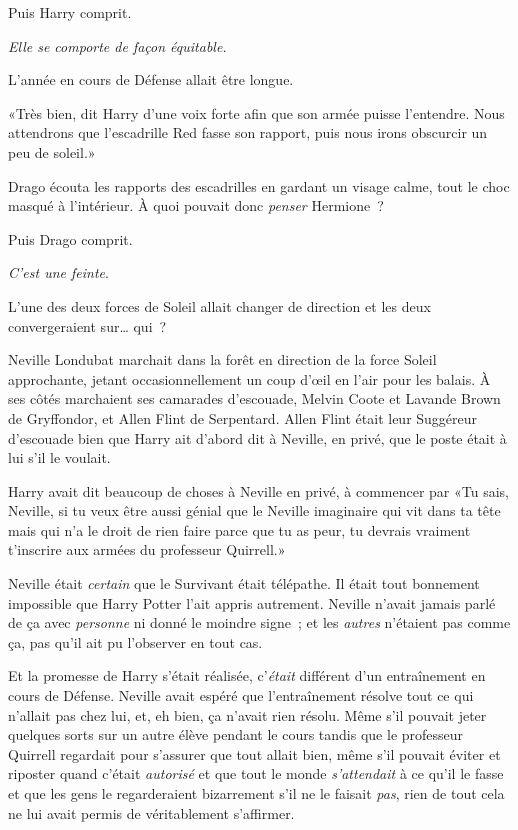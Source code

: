 Puis Harry comprit.

\emph{Elle se comporte de façon équitable.}

L'année en cours de Défense allait être longue.

«Très bien, dit Harry d'une voix forte afin que son armée puisse l'entendre. Nous attendrons que l'escadrille Red fasse son rapport, puis nous irons obscurcir un peu de soleil.»

\later

Drago écouta les rapports des escadrilles en gardant un visage calme, tout le choc masqué à l'intérieur. À quoi pouvait donc \emph{penser} Hermione~?

Puis Drago comprit.

\emph{C'est une feinte}.

L'une des deux forces de Soleil allait changer de direction et les deux convergeraient sur… qui~?

\later

Neville Londubat marchait dans la forêt en direction de la force Soleil approchante, jetant occasionnellement un coup d'œil en l'air pour les balais. À ses côtés marchaient ses camarades d'escouade, Melvin Coote et Lavande Brown de Gryffondor, et Allen Flint de Serpentard. Allen Flint était leur Suggéreur d'escouade bien que Harry ait d'abord dit à Neville, en privé, que le poste était à lui s'il le voulait.

Harry avait dit beaucoup de choses à Neville en privé, à commencer par «Tu sais, Neville, si tu veux être aussi génial que le Neville imaginaire qui vit dans ta tête mais qui n'a le droit de rien faire parce que tu as peur, tu devrais vraiment t'inscrire aux armées du professeur Quirrell.»

Neville était \emph{certain} que le Survivant était télépathe. Il était tout bonnement impossible que Harry Potter l'ait appris autrement. Neville n'avait jamais parlé de ça avec \emph{personne} ni donné le moindre signe~; et les \emph{autres} n'étaient pas comme ça, pas qu'il ait pu l'observer en tout cas.

Et la promesse de Harry s'était réalisée, c'\emph{était} différent d'un entraînement en cours de Défense. Neville avait espéré que l'entraînement résolve tout ce qui n'allait pas chez lui, et, eh bien, ça n'avait rien résolu. Même s'il pouvait jeter quelques sorts sur un autre élève pendant le cours tandis que le professeur Quirrell regardait pour s'assurer que tout allait bien, même s'il pouvait éviter et riposter quand c'était \emph{autorisé} et que tout le monde \emph{s'attendait} à ce qu'il le fasse et que les gens le regarderaient bizarrement s'il ne le faisait \emph{pas}, rien de tout cela ne lui avait permis de véritablement s'affirmer.

